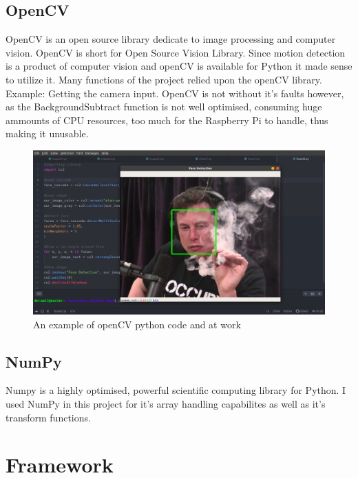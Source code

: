 \subsection{OpenCV}
OpenCV is an open source library dedicate to image processing and computer vision. OpenCV is short for Open Source Vision Library. Since motion detection is a product of computer vision and openCV is available for Python it made sense to utilize it. Many functions of the project relied upon the openCV library. Example: Getting the camera input. OpenCV is not without it's faults however, as the BackgroundSubtract function is not well optimised, consuming huge ammounts of CPU resources, too much for the Raspberry Pi to handle, thus making it unusable. ~\cite{openCVAbout}
\begin{figure}[!htbp] 
    \centering
    \includegraphics[scale = 0.35]{img/openCV.png}
    \caption{An example of openCV python code and at work}
    \label{fig:my_label}
\end{figure}
\subsection{NumPy}
Numpy is a highly optimised, powerful scientific computing library for Python. I used NumPy in this project for it's array handling capabilites as well as it's transform functions.~\cite{numpy}

\section{Framework}
